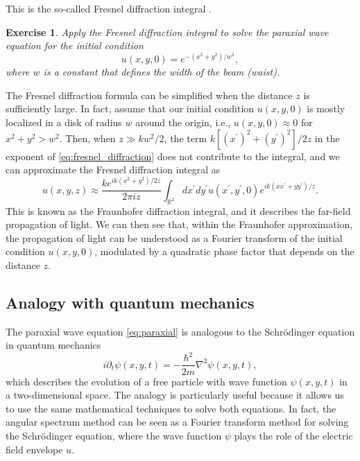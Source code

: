 \documentclass[openany,a4paper,oneside,11pt]{article}
\newtheorem{exe}{Exercise}
\begin{document}
This is the so-called Fresnel diffraction integral \cite{goodman2017introduction, schmidt2010numerical}.

\begin{exe}
    Apply the Fresnel diffraction integral to solve the paraxial wave equation for the initial condition
    \begin{equation}
        u(x,y,0) = e^{-(x^2+y^2)/w^2},
    \end{equation}
    where $w$ is a constant that defines the width of the beam (waist). 
\end{exe}

The Fresnel diffraction formula can be simplified when the distance $z$ is sufficiently large. In fact, assume that our initial condition $u(x,y,0)$ is mostly localized in a disk of radius $w$ around the origin, i.e., $u(x,y,0) \approx 0$ for $x^2+y^2 > w^2$. Then, when $z \gg kw^2/2$, the term $k[(x^\prime)^2 + (y^\prime)^2] / 2z$ in the exponent of \eqref{eq:fresnel_diffraction} does not contribute to the integral, and we can approximate the Fresnel diffraction integral as
\begin{equation}
    u(x,y,z) \approx \frac{k e^{ik\left( x^2 + y^2 \right) / 2z}}{2\pi i z} \int_{\mathbb{R}^2} dx^\prime dy^\prime u(x^\prime,y^\prime,0) e^{ik\left( xx^\prime + yy^\prime \right) / z}.
\end{equation}
This is known as the Fraunhofer diffraction integral, and it describes the far-field propagation of light. We can then see that, within the Fraunhofer approximation, the propagation of light can be understood as a Fourier transform of the initial condition $u(x,y,0)$, modulated by a quadratic phase factor that depends on the distance $z$.

\subsection{Analogy with quantum mechanics}

The paraxial wave equation \eqref{eq:paraxial} is analogous to the Schrödinger equation in quantum mechanics
\begin{equation}
    i \partial_t \psi(x, y, t) = -\frac{\hbar^2}{2m} \nabla^2 \psi(x, y, t),
\end{equation}
which describes the evolution of a free particle with wave function $\psi(x, y, t)$ in a two-dimensional space. The analogy is particularly useful because it allows us to use the same mathematical techniques to solve both equations. In fact, the angular spectrum method can be seen as a Fourier transform method for solving the Schrödinger equation, where the wave function $\psi$ plays the role of the electric field envelope $u$.
\end{document}
